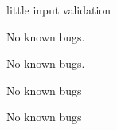 \begin{DoxyRefList}
little input validation  
\item[File \mbox{\hyperlink{_sprint_8cpp}{Sprint.cpp}} ]\label{bug__bug000018}%
%
No known bugs.  
\item[File \mbox{\hyperlink{_sprint_8h}{Sprint.h}} ]\label{bug__bug000019}%
%
No known bugs.  
\item[File \mbox{\hyperlink{_user_story_8cpp}{User\+Story.cpp}} ]\label{bug__bug000020}%
%
No known bugs  
\item[File \mbox{\hyperlink{_user_story_8h}{User\+Story.h}} ]\label{bug__bug000021}%
%
No known bugs 
\end{DoxyRefList}